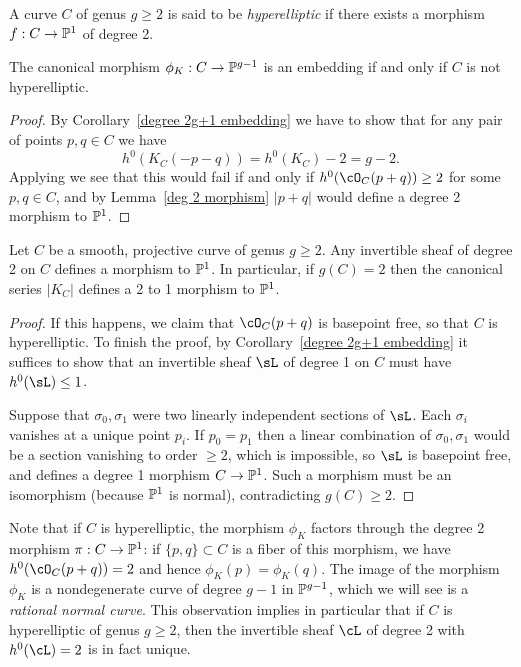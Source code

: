 \begin{definition}
A curve $C$ of genus $g \geq 2$ is said to be \emph{hyperelliptic} if there exists a morphism $f: C \to \PP^1$ of degree 2. \end{definition}


\begin{proposition}
The canonical morphism $\phi_K : C \to \PP^{g-1}$ is an embedding if and only if $C$ is not hyperelliptic.
\end{proposition}

\begin{proof}
By Corollary~\ref{degree 2g+1 embedding} we have to show that for any pair of points $p, q \in C$ we have
$$
h^0(K_C(-p-q)) = h^0(K_C)-2 = g-2.
$$
Applying \trr we see that this would fail if and only if $h^0(\cO_C(p+q)) \geq 2$ for some $p,q \in C$, and by Lemma~\ref{deg 2 morphism} $|p+q|$ would define a degree 2 morphism to $\PP^{1}$. 
\end{proof}

\begin{lemma}\label{deg 2 morphism}
Let $C$ be a smooth, projective curve of genus $g\geq 2$. Any invertible sheaf of degree 2 on $C$ defines a morphism to $\PP^{1}$. In particular, if $g(C) = 2$ then the canonical series $|K_{C}|$ defines a 2 to 1 morphism to $\PP^{1}$.
\end{lemma}

\begin{proof}
 If this happens,
we claim that $\cO_C(p+q)$ is basepoint free, so that $C$ is hyperelliptic. To finish the proof, by Corollary~\ref{degree 2g+1 embedding} it suffices to show that
 an invertible sheaf $\sL$ of degree 1 on $C$ must have $h^{0}(\sL)\leq 1$.
 
Suppose that $\sigma_{0}, \sigma_{1}$ were two linearly independent sections of $\sL$. Each $\sigma_{i}$ vanishes at a unique point $p_{i}$. If $p_{0}= p_{1}$ then a linear combination of $\sigma_{0}, \sigma_{1}$ would be a section vanishing to order $\geq 2$, which is impossible, so $\sL$ is basepoint free, and defines a degree 1 morphism $C\to \PP^{1}$. Such a morphism must be an isomorphism (because $\PP^{1}$ is normal), contradicting $g(C) \geq 2$.
\end{proof}

Note that if $C$ is hyperelliptic, the morphism $\phi_K$ factors through the degree 2 morphism $\pi : C \to \PP^1$: if $\{p,q\} \subset C$ is a fiber of this morphism, we have $h^0(\cO_C(p+q)) = 2$ and hence $\phi_K(p) = \phi_K(q)$. The image of the morphism $\phi_K$ is a nondegenerate curve of degree $g-1$ in $\PP^{g-1}$, which we will see is a \emph{rational normal curve}. This observation implies in particular that if $C$ is hyperelliptic of genus $g \geq 2$, then the invertible sheaf $\cL$ of degree 2 with $h^0(\cL) = 2$ is in fact unique.

